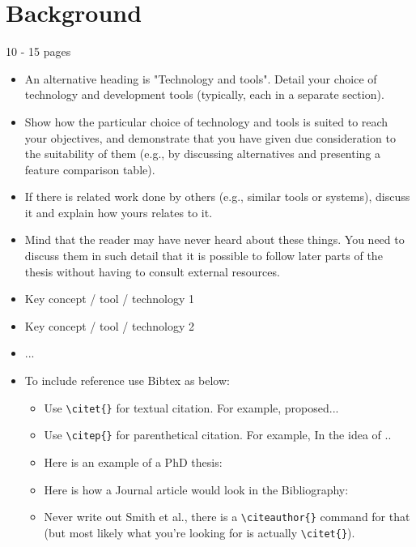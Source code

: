 
\chapter{Background}
\label{ch:background}
10 - 15 pages

\begin{itemize}
   \item An alternative heading is "Technology and tools".
Detail your choice of technology and development tools (typically, each in a separate section).
   \item Show how the particular choice of technology and tools is suited to reach your objectives, and demonstrate that you have given due consideration to the suitability of them (e.g., by discussing alternatives and presenting a feature comparison table).
   \item If there is related work done by others (e.g., similar tools or systems), discuss it and explain how yours relates to it.
   \item Mind that the reader may have never heard about these things. You need to discuss them in such detail that it is possible to follow later parts of the thesis without having to consult external resources.
    \item Key concept / tool / technology 1
    \item Key concept / tool / technology 2
    \item ...
    \item To include reference use Bibtex as below:
    \begin{itemize}
    \item Use \verb|\citet{}| for textual citation. For example, \citet{Balog:2018:Book} proposed...
    \item Use \verb|\citep{}| for parenthetical citation. For example, In \citep{Zhang:2020:KDD} the idea of ..
    \item Here is an example of a PhD thesis:  \citet{Maxwell:2019:PhDThesis} 
    \item Here is how a Journal article would look in the Bibliography: \citet{Sanderson:2010:FnTIR}
    \item Never write out Smith et al., there is a \verb|\citeauthor{}| command for that (but most likely what you're looking for is actually \verb|\citet{}|).
    \end{itemize}
\end{itemize}

